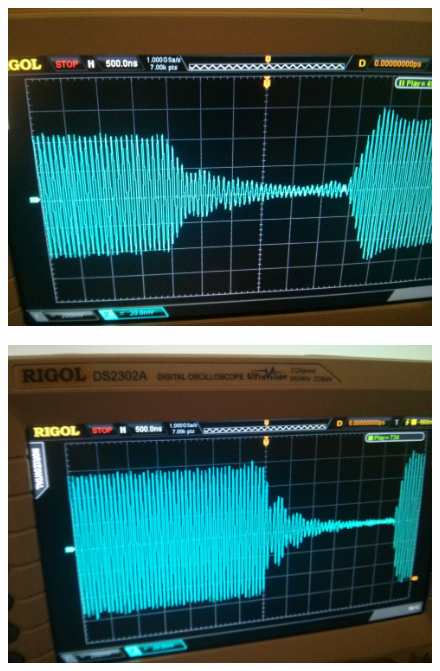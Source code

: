 \documentclass[fleqn,10pt]{SelfArx} %
\begin{document}
\begin{figure}[h]
\centering
\begin{minipage}[b]{.47\linewidth}
  \centering
  \includegraphics[width=\textwidth]{img/emulated}
  \label{fig:emulated}
\end{minipage}
\begin{minipage}[b]{.47\linewidth}
  \centering
  \includegraphics[width=\textwidth]{img/real}
  \label{fig:real}
\end{minipage}
\end{figure}
\end{document}
